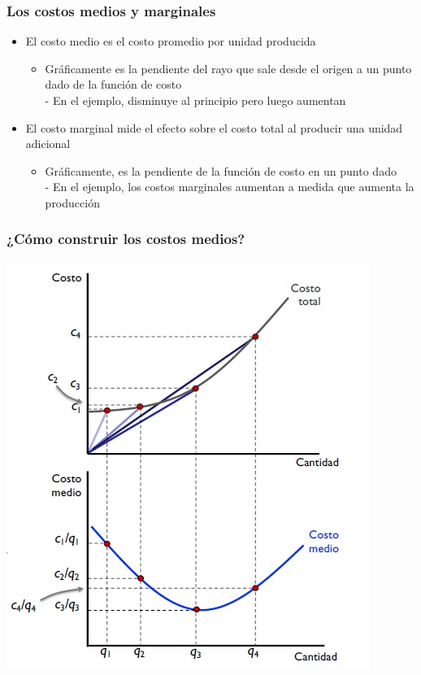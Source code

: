 \documentclass{beamer}
\begin{document}
\begin{frame}
\frametitle{ Los costos medios y marginales}
\begin{itemize}
    \item El costo medio es el costo promedio por unidad producida
    \begin{itemize}
        \item Gráficamente es la pendiente del rayo que sale desde el origen a un punto dado de la función de costo \\
        - En el ejemplo, disminuye al principio pero luego aumentan 
    \end{itemize}
    \item El costo marginal mide el efecto sobre el costo total al producir una unidad adicional
    \begin{itemize}
        \item Gráficamente, es la pendiente de la función de costo en un punto dado \\
        - En el ejemplo, los costos marginales aumentan a medida que aumenta la producción
    \end{itemize}
\end{itemize}
\end{frame}

\begin{frame}
\frametitle{ ¿Cómo construir los costos medios?}
\centering
\includegraphics[scale=0.6]{Figures/Tema_06.21_funciondeproduccionmedialunas7.jpg}
\end{frame}
\end{document}

